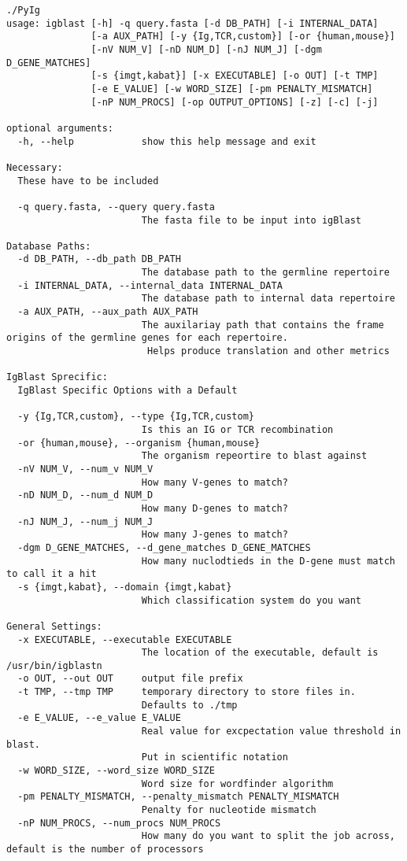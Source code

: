 \begin{lstlisting}[breaklines=true]
./PyIg
usage: igblast [-h] -q query.fasta [-d DB_PATH] [-i INTERNAL_DATA]
               [-a AUX_PATH] [-y {Ig,TCR,custom}] [-or {human,mouse}]
               [-nV NUM_V] [-nD NUM_D] [-nJ NUM_J] [-dgm D_GENE_MATCHES]
               [-s {imgt,kabat}] [-x EXECUTABLE] [-o OUT] [-t TMP]
               [-e E_VALUE] [-w WORD_SIZE] [-pm PENALTY_MISMATCH]
               [-nP NUM_PROCS] [-op OUTPUT_OPTIONS] [-z] [-c] [-j]

optional arguments:
  -h, --help            show this help message and exit

Necessary:
  These have to be included

  -q query.fasta, --query query.fasta
                        The fasta file to be input into igBlast

Database Paths:
  -d DB_PATH, --db_path DB_PATH
                        The database path to the germline repertoire
  -i INTERNAL_DATA, --internal_data INTERNAL_DATA
                        The database path to internal data repertoire
  -a AUX_PATH, --aux_path AUX_PATH
                        The auxilariay path that contains the frame origins of the germline genes for each repertoire.
                         Helps produce translation and other metrics

IgBlast Sprecific:
  IgBlast Specific Options with a Default

  -y {Ig,TCR,custom}, --type {Ig,TCR,custom}
                        Is this an IG or TCR recombination
  -or {human,mouse}, --organism {human,mouse}
                        The organism repeortire to blast against
  -nV NUM_V, --num_v NUM_V
                        How many V-genes to match?
  -nD NUM_D, --num_d NUM_D
                        How many D-genes to match?
  -nJ NUM_J, --num_j NUM_J
                        How many J-genes to match?
  -dgm D_GENE_MATCHES, --d_gene_matches D_GENE_MATCHES
                        How many nuclodtieds in the D-gene must match to call it a hit
  -s {imgt,kabat}, --domain {imgt,kabat}
                        Which classification system do you want

General Settings:
  -x EXECUTABLE, --executable EXECUTABLE
                        The location of the executable, default is /usr/bin/igblastn
  -o OUT, --out OUT     output file prefix
  -t TMP, --tmp TMP     temporary directory to store files in.
                        Defaults to ./tmp
  -e E_VALUE, --e_value E_VALUE
                        Real value for excpectation value threshold in blast.
                        Put in scientific notation
  -w WORD_SIZE, --word_size WORD_SIZE
                        Word size for wordfinder algorithm
  -pm PENALTY_MISMATCH, --penalty_mismatch PENALTY_MISMATCH
                        Penalty for nucleotide mismatch
  -nP NUM_PROCS, --num_procs NUM_PROCS
                        How many do you want to split the job across, default is the number of processors


\end{lstlisting}
